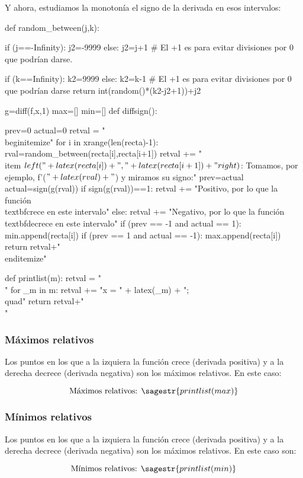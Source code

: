 Y ahora, estudiamos la monotonía el signo de la derivada en esos intervalos:
   
\begin{sagesilent}

def random_between(j,k):
    
    if (j==-Infinity):
        j2=-9999
    else:
        j2=j+1 # El +1 es para evitar divisiones por 0 que podrían darse.
        
    if (k==Infinity):
        k2=9999
    else:        
        k2=k-1 # El +1 es para evitar divisiones por 0 que podrían darse
    return int(random()*(k2-j2+1))+j2

g=diff(f,x,1)
max=[]
min=[]
def diffsign():

    prev=0
    actual=0
    retval = "\\begin{itemize}"
    for i in xrange(len(recta)-1):
        rval=random_between(recta[i],recta[i+1])
        retval += "\\item $\\left("+latex(recta[i])+","+latex(recta[i+1])+"\\right)$: Tomamos, por ejemplo, f'($"+latex(rval)+"$) y miramos su signo:" 
        prev=actual
        actual=sign(g(rval))
        if sign(g(rval))==1: 
            retval += "Positivo, por lo que la función \\textbf{crece} en este intervalo"  
        else:
            retval += "Negativo, por lo que la función \\textbf{decrece} en este intervalo"
        if (prev == -1 and actual == 1):
            min.append(recta[i])
        if (prev == 1 and actual == -1):
            max.append(recta[i])
    return retval+"\\end{itemize}"

def printlist(m):
    retval = "\\{"
    for _m in m:
    	retval += "x = " + latex(_m) + ";\\quad"
    return retval+"\\}"

\end{sagesilent}


\subsubsection{Máximos relativos}
Los puntos en los que a la izquiera la función crece (derivada positiva) y a la derecha decrece (derivada negativa) son los máximos relativos. En este caso: 

\[\text{Máximos relativos: } \sagestr{printlist(max)}\]

\subsubsection{Mínimos relativos}
Los puntos en los que a la izquiera la función crece (derivada positiva) y a la derecha decrece (derivada negativa) son los máximos relativos. En este caso son: 

\[\text{Mínimos relativos: }\sagestr{printlist(min)}\]
